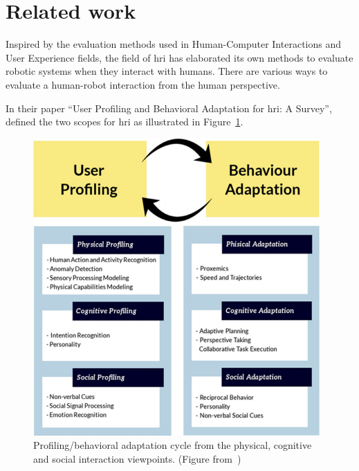 \documentclass[a4paper,11pt,twoside]{StyleThese}
\begin{document}
\section{Related work}\label{sec:rel}

Inspired by the evaluation methods used in Human-Computer Interactions and User Experience fields, the field of \acrfull{hri} has elaborated its own methods to evaluate robotic systems when they interact with humans. There are various ways to evaluate a human-robot interaction from the human perspective.

In their paper ``User Profiling and Behavioral Adaptation for \acrshort{hri}: A Survey'', \cite{rossi_2017_user} defined the two scopes for \acrshort{hri} as illustrated in Figure~\ref{fig:profiling}. 

\begin{figure}[!ht]
	\centering
	\includegraphics[width=0.5\linewidth]{figures/chapter2/profiling.png}
	\caption{Profiling/behavioral adaptation cycle from the physical, cognitive and social interaction viewpoints. (Figure from~\citep{rossi_2017_user})}
	\label{fig:profiling}
\end{figure}
\end{document}
